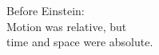\documentclass[preview]{standalone}
\begin{document}
\begin{center}
Before Einstein:\\Motion was relative, but \\ time and space were absolute.
\end{center}
\end{document}
